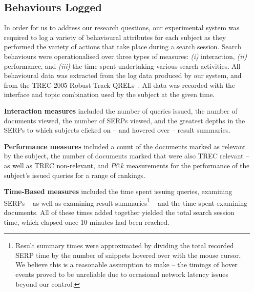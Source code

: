 \subsection{Behaviours Logged}\label{sec:method:behaviours}
In order for us to address our research questions, our experimental system was required to log a variety of behavioural attributes for each subject as they performed the variety of actions that take place during a search session. Search behaviours were operationalised over three types of measures: \emph{(i)} interaction, \emph{(ii)} performance, and \emph{(iii)} the time spent undertaking various search activities. All behavioural data was extracted from the log data produced by our system, and from the TREC 2005 Robust Track QRELs~\cite{voorhees2006trec_robust}. All data was recorded with the interface and topic combination used by the subject at the given time.

\vspace{2mm}
\noindent\textbf{Interaction measures} included the number of queries issued, the number of documents viewed, the number of SERPs viewed, and the greatest depths in the SERPs to which subjects clicked on -- and hovered over -- result summaries.

\vspace{2mm}
\noindent\textbf{Performance measures} included a count of the documents marked as relevant by the subject, the number of documents marked that were also TREC relevant -- as well as TREC non-relevant, and $P@k$ measurements for the performance of the subject's issued queries for a range of rankings.

\vspace{2mm}
\noindent\textbf{Time-Based measures} included the time spent issuing queries, examining SERPs -- as well as examining result summaries\footnote{Result summary times were approximated by dividing the total recorded SERP time by the number of snippets hovered over with the mouse cursor. We believe this is a reasonable assumption to make -- the timings of hover events proved to be unreliable due to occasional network latency issues beyond our control.} -- and the time spent examining documents. All of these times added together yielded the total search session time, which elapsed once 10 minutes had been reached.


